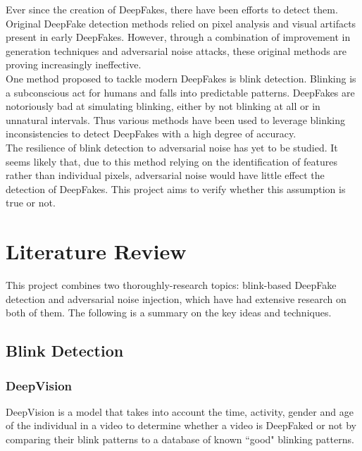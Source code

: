 \documentclass{article}
\begin{document}
Ever since the creation of DeepFakes, there have been efforts to detect them. Original DeepFake detection methods relied on pixel analysis and visual artifacts present in early DeepFakes\cite{yu2021survey}. However, through a combination of improvement in generation techniques and adversarial noise attacks\cite{huang2020fakeretouch}\cite{pertubations}, these original methods are proving increasingly ineffective.\\

One method proposed to tackle modern DeepFakes is blink detection. Blinking is a subconscious act for humans and falls into predictable patterns. DeepFakes are notoriously bad at simulating blinking, either by not blinking at all or in unnatural intervals. Thus various methods have been used to leverage blinking inconsistencies to detect DeepFakes with a high degree of accuracy\cite{blinking-pattern}.\\

The resilience of blink detection to adversarial noise has yet to be studied. It seems likely that, due to this method relying on the identification of features rather than individual pixels, adversarial noise would have little effect the detection of DeepFakes. This project aims to verify whether this assumption is true or not.

\section{Literature Review} \label{sec:literature-review}

This project combines two thoroughly-research topics: blink-based DeepFake detection and adversarial noise injection, which have had extensive research on both of them. The following is a summary on the key ideas and techniques.

\subsection{Blink Detection}
\subsubsection{DeepVision}

DeepVision\cite{blinking-pattern} is a model that takes into account the time, activity, gender and age of the individual in a video to determine whether a video is DeepFaked or not by comparing their blink patterns to a database of known ``good" blinking patterns.\\
\end{document}
